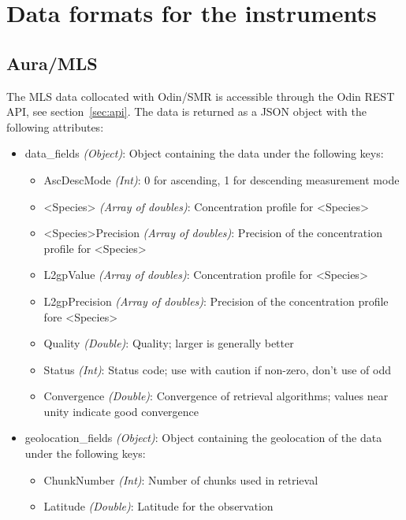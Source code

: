 \chapter{Data formats for the instruments}
\label{sec:dataformats}
\section{Aura/MLS}
The MLS data collocated with Odin/SMR is accessible through the Odin REST
API, see section~\ref{sec:api}. The data is returned as a JSON object with the
following attributes:
\begin{itemize}
    \item data\_fields \emph{(Object)}: Object containing the data under the
        following keys:
        \begin{itemize}
            \item AscDescMode \emph{(Int)}: 0 for ascending, 1 for descending
                measurement mode
            \item <Species> \emph{(Array of doubles)}: Concentration profile
                for <Species>
            \item <Species>Precision \emph{(Array of doubles)}: Precision of
                the concentration profile for <Species>
            \item L2gpValue \emph{(Array of doubles)}: Concentration profile
                for <Species>
            \item L2gpPrecision \emph{(Array of doubles)}: Precision of the
                concentration profile fore <Species>
            \item Quality \emph{(Double)}: Quality; larger is generally better
            \item Status \emph{(Int)}: Status code; use with caution if
                non-zero, don't use of odd
            \item Convergence \emph{(Double)}: Convergence of retrieval
                algorithms; values near unity indicate good convergence
        \end{itemize}
    \item geolocation\_fields \emph{(Object)}: Object containing the
        geolocation of the data under the following keys:
        \begin{itemize}
            \item ChunkNumber \emph{(Int)}: Number of chunks used in retrieval
            \item Latitude \emph{(Double)}: Latitude for the observation

\end{itemize}
\end{itemize}
